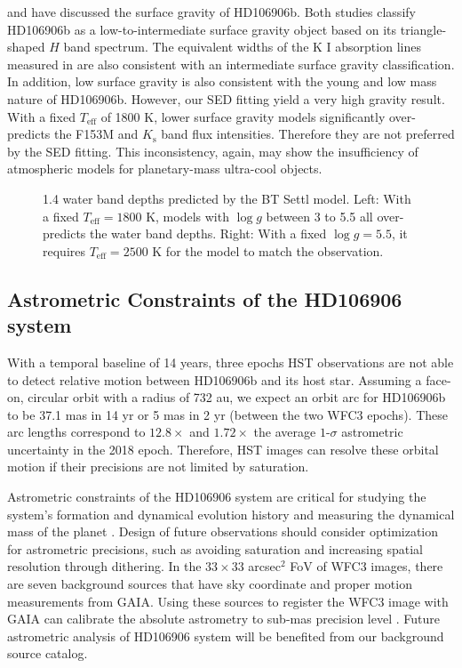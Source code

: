 \documentclass[twocolumn]{aastex62}
\begin{document}
\citet{Bailey2013} and \citet{Daemgen2017} have discussed the surface gravity of HD106906b. Both studies classify HD106906b as a low-to-intermediate surface gravity object based on its triangle-shaped $H$ band spectrum. The equivalent widths of the K I absorption lines measured in \citet{Daemgen2017} are also consistent with an intermediate surface gravity classification. In addition, low surface gravity is also consistent with the young and low mass nature of HD106906b. However, our SED fitting yield a very high gravity result. With a fixed $T_{\mathrm{eff}}$ of 1800 K, lower surface gravity models significantly over-predicts the F153M and $K_{\mathrm{s}}$ band flux intensities. Therefore they are not preferred by the SED fitting. This inconsistency, again, may show the insufficiency of atmospheric models for planetary-mass ultra-cool objects.

\begin{figure}
  \centering
  \caption{1.4 \micron{} water band depths predicted by the BT Settl model. Left: With a fixed $T_{\mathrm{eff}}=1800$ K, models with $\log g$ between 3 to 5.5 all over-predicts the water band depths. Right: With a fixed $\log g=5.5$, it requires $T_{\mathrm{eff}}=2500$ K for the model to match the observation.}
  \label{fig:waterdepth}
\end{figure}

\subsection{Astrometric Constraints of the  HD106906 system}

With a temporal baseline of 14 years, three epochs HST observations are not able to detect relative motion between HD106906b and its host star. Assuming a face-on, circular orbit with a radius of 732 au, we expect an orbit arc for HD106906b to be 37.1 mas in 14 yr or 5 mas in 2 yr (between the two WFC3 epochs). These arc lengths correspond to $12.8\times$ and $1.72\times$ the average $1$-$\sigma$ astrometric uncertainty in the 2018 epoch. Therefore, HST images can resolve these orbital motion if their precisions are not limited by saturation.

Astrometric constraints of the HD106906 system are critical for studying the system's formation and dynamical evolution history \citep[e.g., ][]{DeRosa2019} and measuring the dynamical mass of the planet \citep[e.g.,][]{Snellen2018,Dupuy2019}. Design of future observations should consider optimization for astrometric precisions, such as avoiding saturation and increasing spatial resolution through dithering. In the $33\times33$ arcsec$^{2}$ FoV of WFC3 images, there are seven background sources that have sky coordinate and proper motion measurements from GAIA. Using these sources to register the WFC3 image with GAIA can calibrate the absolute astrometry to sub-mas precision level \cite{Bedin2018}. Future astrometric analysis of HD106906 system will be benefited from our background source catalog.
\end{document}
